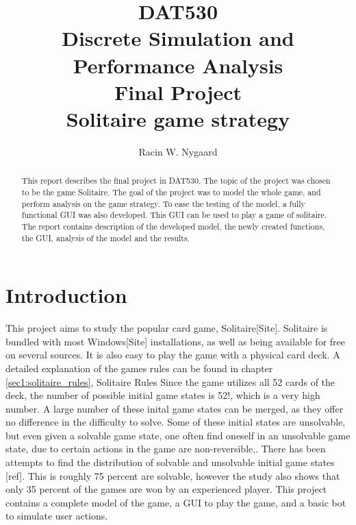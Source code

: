 \documentclass[runningheads,a4paper]{llncs}
\begin{document}
\mainmatter  %
\title{DAT530\\Discrete Simulation and Performance Analysis\\Final Project\\Solitaire game strategy}
\author{Racin W. Nygaard}

\tocauthor{ }
\maketitle
	


\begin{abstract}
This report describes the final project in DAT530. The topic of the project was chosen to be the game Solitaire. The goal of the project was to model the whole game, and perform analysis on the game strategy. To ease the testing of the model, a fully functional GUI was also developed. This GUI can be used to play a game of solitaire. The report contains description of the developed model, the newly created functions, the GUI, analysis of the model and the results.

\end{abstract}

\setcounter{tocdepth}{3}
\setcounter{secnumdepth}{3}

\tableofcontents
\listoffigures
\listoftables
\printacronyms[name=Abbreviations,include-classes=abbrev]
\printacronyms[name=Nomenclature,include-classes=nomencl]
\section{Introduction}
This project aims to study the popular card game, Solitaire[Site]. Solitaire is bundled with most Windows[Site] installations, as well as being available for free on several sources. It is also easy to play the game with a physical card deck. A detailed explanation of the games rules can be found in chapter \ref{sec1:solitaire_rules}, Solitaire Rules
\newline
Since the game utilizes all 52 cards of the deck, the number of possible initial game states is 52!, which is a very high number. A large number of these inital game states can be merged, as they offer no difference in the difficulty to solve. Some of these initial states are unsolvable, but even given a solvable game state, one often find oneself in an unsolvable game state, due to certain actions in the game are non-reversible,. There has been attempts to find the distribution of solvable and unsolvable initial game states [ref]. This is roughly 75 percent are solvable, however the study also shows that only 35 percent of the games are won by an experienced player.
\newline
This project contains a complete model of the game, a GUI to play the game, and a basic bot to simulate user actions. 
\end{document}
